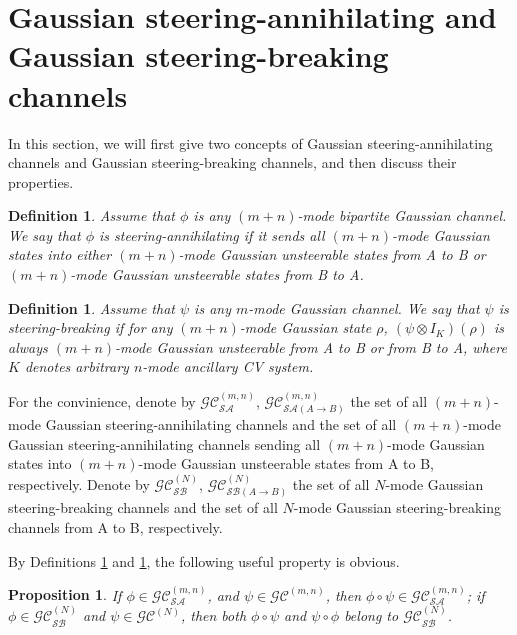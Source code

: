 \documentclass[10pt,aps,pra,amsfonts,amssymb,amsmath,%
floatfix,nofootinbib, groupedaddress,superscriptaddress,citesort,twocolumn
]{revtex4}%
\newtheorem{proposition}[theorem]{Proposition}
\newtheorem{definition}[theorem]{Definition}
\begin{document}
	
\section{ Gaussian steering-annihilating   and  Gaussian steering-breaking channels }


In this section,  we will first give two  concepts of Gaussian steering-annihilating  channels and Gaussian   steering-breaking channels, and then discuss their properties.





	\begin{definition}\label{def4}
	Assume that  $\phi$ is  any   $(m+n)$-mode bipartite  Gaussian channel. We say that $\phi$   is    steering-annihilating  if it sends all $(m+n)$-mode Gaussian states    into either  $(m+n)$-mode Gaussian unsteerable states from A to B or $(m+n)$-mode Gaussian unsteerable states from B to A.
\end{definition}

	\begin{definition}\label{def41}
Assume that $\psi$ is any $m$-mode Gaussian channel. We say that  $\psi $  is  steering-breaking  if for any $(m+n)$-mode  Gaussian state $\rho$,   $(\psi \otimes I_K)( \rho)$ is always $(m+n)$-mode Gaussian unsteerable from A to B or from B to A,   where $K$ denotes arbitrary $n$-mode ancillary CV system.
\end{definition}


	  For the convinience,
denote by  $ {\mathcal {GC}}^{(m,n)}_{\mathcal {SA}}$,  ${\mathcal {GC}}^{(m,n)}_{\mathcal {SA} (A\rightarrow B)}$ the set of all  $(m+n)$-mode Gaussian steering-annihilating channels and 
the set of all $(m+n)$-mode  Gaussian steering-annihilating channels  sending all $(m+n)$-mode Gaussian states    into  $(m+n)$-mode Gaussian unsteerable states from A to B, respectively. Denote by $ {\mathcal {GC}}^{(N)}_{\mathcal {SB}}$,  $ {\mathcal {GC}}^{(N)}_{\mathcal {SB}(A\rightarrow B)}$ the set of all $N$-mode Gaussian steering-breaking channels and the set of all $N$-mode Gaussian steering-breaking channels from A to B, respectively.






 By Definitions \ref{def4} and \ref{def41},   the following useful property is obvious.


  \begin{proposition}  \label{P1}  If $\phi \in {\mathcal {GC}}^{(m,n)}_{\mathcal {SA}}$,  and   $\psi \in {\mathcal {GC}}^{(m,n)} $,  then $\phi \circ \psi \in {\mathcal {GC}}^{(m,n)}_{\mathcal {SA}}$; if $\phi \in {\mathcal {GC}}^{(N)}_{\mathcal {SB}}$ and $\psi \in {\mathcal {GC}}^{(N)} $,  then both $\phi \circ \psi$ and $\psi \circ \phi$ belong to  ${\mathcal {GC}}^{(N)}_{\mathcal {SB}}$.
  \end{proposition}
\end{document}
